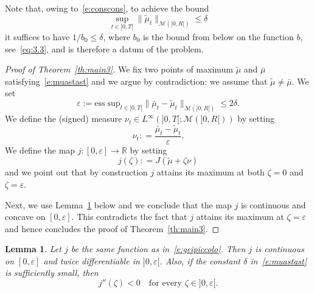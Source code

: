 \documentclass[11pt,leqno]{amsart}
\newtheorem{lemma}[theorem]{Lemma}
\numberwithin{equation}{section}
\begin{document}
Note that, owing to~\eqref{e:conscons}, to achieve the bound 
$$
    \sup_{t \in ]0, T[} 
     \| \tilde \mu_t \|_{\mathcal M (]0, R[)} \leq \delta
$$
it suffices to have $1/b_0 \leq \delta$, where $b_0$ is the bound from below on the function $b$, see~\eqref{eq:3.3}, and is therefore a datum of the problem. 
\begin{proof}[Proof of Theorem~\ref{th:main3}]
We fix two points of maximum $\tilde \mu$ and $\bar \mu$ satisfying~\eqref{e:muastast} and we argue by contradiction: we assume that $\tilde \mu \neq \bar \mu$. We set 
\begin{equation}
\label{e:nueps}
   \varepsilon:= \mathrm{ess \; sup}_{t \in ]0, T[} \|
      \bar \mu_t - \tilde \mu_t \|_{\mathcal M(]0, R[)} \leq 2 \delta .
\end{equation}
We define the (signed) measure $\nu_t \in L^\infty (]0, T[; \mathcal M(]0, R[))$ by setting 
 \begin{equation}
 \label{e:nu}
     \nu_t : =
      \frac{\bar \mu_t - \tilde \mu_t}{\varepsilon}  .
  \end{equation}
We define the map $j: [0, \varepsilon] \to {\mathbb{R}}$ by setting 
\begin{equation}
\label{e:geipiccolo}
    j(\zeta) : = J(\tilde \mu + \zeta \nu) 
\end{equation}
and we point out that by construction $j$ attains its maximum at both $\zeta =0$ and $\zeta= \varepsilon$.   

Next, we use Lemma~\ref{l:concave} below and we conclude that the map $j$ is continuous and concave on $[0, \varepsilon]$. This contradicts the fact that $j$ attains its maximum at $\zeta=\varepsilon$ and hence concludes the proof of Theorem~\ref{th:main3}. 
\end{proof}
\begin{lemma}
\label{l:concave}
Let $j$ be the same function as in~\eqref{e:geipiccolo}. Then $j$ is continuous on $[0, \varepsilon]$ and twice differentiable in $]0, \varepsilon[$. Also, if the constant $\delta$ in~\eqref{e:muastast} is sufficiently small, then 
\begin{equation}
   j''(\zeta) <0 \quad \text{for every $\zeta \in ]0, \varepsilon[$.} 
\end{equation} 
\end{lemma}
\end{document}
